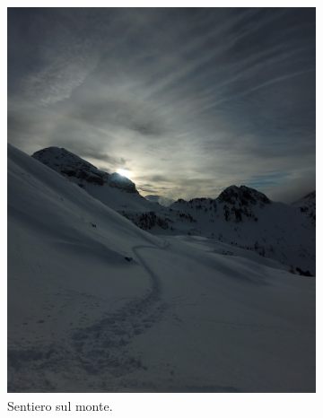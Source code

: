 \documentclass{article}
\begin{document}
\begin{figure}[H]
    \centering
    \begin{subfigure}[b]{0.45\textwidth}
        \includegraphics[width=\textwidth]{images/foto_sentiero.jpg}
        \caption{Sentiero sul monte.}
    \end{subfigure}
    \hfill
    \begin{subfigure}[b]{0.45\textwidth}

\end{subfigure}
\end{figure}
\end{document}
